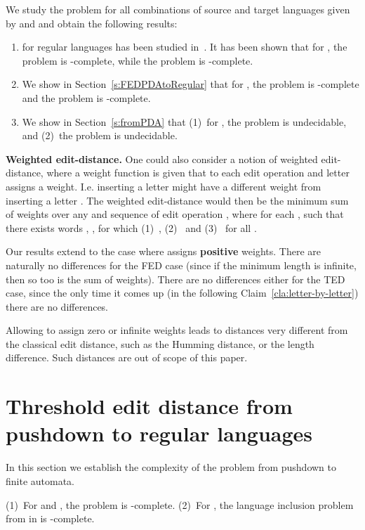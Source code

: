 \documentclass{CSML}
\begin{document}
\noindent We study the  problem for all combinations of 
source and target languages given by  and  and obtain the following results:
\begin{enumerate}
\item  for regular languages has been studied in~\cite{boundedRiveros}.
It has been shown that for , the problem 
 is -complete, while the problem
 is -complete.
\item We show in Section~\ref{s:FEDPDAtoRegular} that for , 
the problem  is -complete and
the problem  is -complete.
\item We show in Section~\ref{s:fromPDA} that
(1)~for , the problem  is undecidable, and
(2)~the problem  is undecidable.
\end{enumerate}

\begin{rem}
{\bf Weighted edit-distance.} 
One could also consider a notion of weighted edit-distance, where a weight function  is given that to each edit operation and letter assigns a weight.
I.e. inserting a letter  might have a different weight from inserting a letter .
The weighted edit-distance  would then be the minimum sum of weights  over any  and sequence of edit operation ,  
 where  for each , such that there exists words , , for which (1)~, (2)~ and (3)~  for all .
 
 Our results extend to the case where  assigns {\bf positive} weights. There are naturally no differences for the FED case (since if the minimum length is infinite, then so too is the sum of weights). There are no  differences either for the TED case, since the only time it comes up (in the following Claim~\ref{cla:letter-by-letter}) there are no differences.
 
 Allowing  to assign zero or infinite weights leads to distances very different from the classical edit distance, such as the Humming distance,
 or the length difference. Such distances are out of scope of this paper.
\end{rem}


 

\section{Threshold edit distance from pushdown to regular languages}
\makeatletter{}\label{s:TEDPDAToRegular}

In this section we establish the complexity of the  problem
from pushdown to finite automata. 

\begin{thm}
(1)~For  and , the  problem  is -complete.
(2)~For , the language inclusion problem from  in  is -complete.
\label{th:mainTED}
\end{thm}
\end{document}
